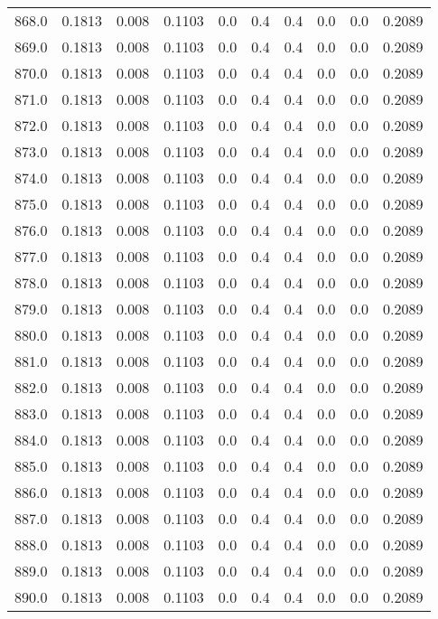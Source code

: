 \begin{longtable}{lrrrrrrrrr}
868.0 & 0.1813 & 0.008 & 0.1103 & 0.0 & 0.4 & 0.4 & 0.0 & 0.0 & 0.2089 \\
869.0 & 0.1813 & 0.008 & 0.1103 & 0.0 & 0.4 & 0.4 & 0.0 & 0.0 & 0.2089 \\
870.0 & 0.1813 & 0.008 & 0.1103 & 0.0 & 0.4 & 0.4 & 0.0 & 0.0 & 0.2089 \\
871.0 & 0.1813 & 0.008 & 0.1103 & 0.0 & 0.4 & 0.4 & 0.0 & 0.0 & 0.2089 \\
872.0 & 0.1813 & 0.008 & 0.1103 & 0.0 & 0.4 & 0.4 & 0.0 & 0.0 & 0.2089 \\
873.0 & 0.1813 & 0.008 & 0.1103 & 0.0 & 0.4 & 0.4 & 0.0 & 0.0 & 0.2089 \\
874.0 & 0.1813 & 0.008 & 0.1103 & 0.0 & 0.4 & 0.4 & 0.0 & 0.0 & 0.2089 \\
875.0 & 0.1813 & 0.008 & 0.1103 & 0.0 & 0.4 & 0.4 & 0.0 & 0.0 & 0.2089 \\
876.0 & 0.1813 & 0.008 & 0.1103 & 0.0 & 0.4 & 0.4 & 0.0 & 0.0 & 0.2089 \\
877.0 & 0.1813 & 0.008 & 0.1103 & 0.0 & 0.4 & 0.4 & 0.0 & 0.0 & 0.2089 \\
878.0 & 0.1813 & 0.008 & 0.1103 & 0.0 & 0.4 & 0.4 & 0.0 & 0.0 & 0.2089 \\
879.0 & 0.1813 & 0.008 & 0.1103 & 0.0 & 0.4 & 0.4 & 0.0 & 0.0 & 0.2089 \\
880.0 & 0.1813 & 0.008 & 0.1103 & 0.0 & 0.4 & 0.4 & 0.0 & 0.0 & 0.2089 \\
881.0 & 0.1813 & 0.008 & 0.1103 & 0.0 & 0.4 & 0.4 & 0.0 & 0.0 & 0.2089 \\
882.0 & 0.1813 & 0.008 & 0.1103 & 0.0 & 0.4 & 0.4 & 0.0 & 0.0 & 0.2089 \\
883.0 & 0.1813 & 0.008 & 0.1103 & 0.0 & 0.4 & 0.4 & 0.0 & 0.0 & 0.2089 \\
884.0 & 0.1813 & 0.008 & 0.1103 & 0.0 & 0.4 & 0.4 & 0.0 & 0.0 & 0.2089 \\
885.0 & 0.1813 & 0.008 & 0.1103 & 0.0 & 0.4 & 0.4 & 0.0 & 0.0 & 0.2089 \\
886.0 & 0.1813 & 0.008 & 0.1103 & 0.0 & 0.4 & 0.4 & 0.0 & 0.0 & 0.2089 \\
887.0 & 0.1813 & 0.008 & 0.1103 & 0.0 & 0.4 & 0.4 & 0.0 & 0.0 & 0.2089 \\
888.0 & 0.1813 & 0.008 & 0.1103 & 0.0 & 0.4 & 0.4 & 0.0 & 0.0 & 0.2089 \\
889.0 & 0.1813 & 0.008 & 0.1103 & 0.0 & 0.4 & 0.4 & 0.0 & 0.0 & 0.2089 \\
890.0 & 0.1813 & 0.008 & 0.1103 & 0.0 & 0.4 & 0.4 & 0.0 & 0.0 & 0.2089 \\

\end{longtable}
